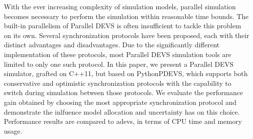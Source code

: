 With the ever increasing complexity of simulation models, parallel simulation
becomes necessary to perform the simulation within reasonable time bounds.
The built-in parallelism of Parallel DEVS is often insufficient to tackle this problem on its own.
Several synchronization protocols have been proposed, each with their distinct advantages and disadvantages.
Due to the significantly different implementation of these protocols, most Parallel DEVS simulation tools are limited to only one such protocol.
In this paper, we present a Parallel DEVS simulator, grafted on C++11, but based on PythonPDEVS, which supports both conservative and optimistic synchronization protocols with the capability to switch during simulation between those protocols.
We evaluate the performance gain obtained by choosing the most appropriate synchronization protocol and demonstrate the inlfuence model allocation and uncertainty has on this choice. 
Performance results are compared to adevs, in terms of CPU time and memory usage.
